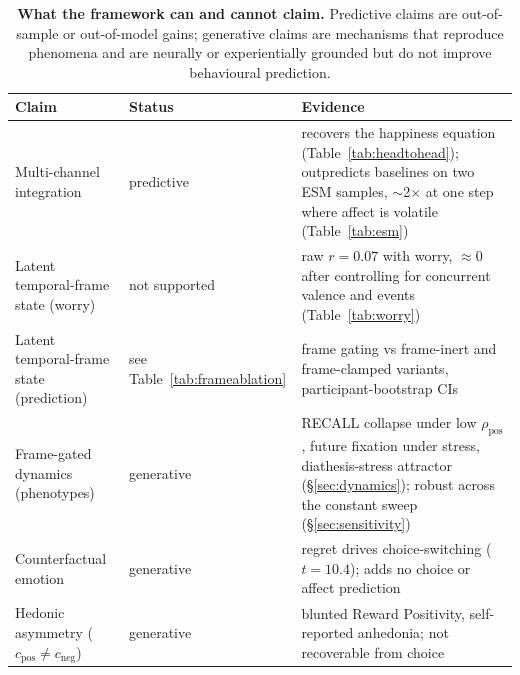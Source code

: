 \documentclass[11pt,a4paper]{article}
\begin{document}
\begin{table}[htbp]
\centering\small
\caption{\textbf{What the framework can and cannot claim.} Predictive claims are
out-of-sample or out-of-model gains; generative claims are mechanisms that reproduce
phenomena and are neurally or experientially grounded but do not improve behavioural
prediction.}
\label{tab:claims}
\begin{tabular}{p{3.9cm}p{1.9cm}p{6.4cm}}
\toprule
Claim & Status & Evidence \\
\midrule
Multi-channel integration & predictive & recovers the happiness equation (Table~\ref{tab:headtohead}); outpredicts baselines on two ESM samples, $\sim$2$\times$ at one step where affect is volatile (Table~\ref{tab:esm}) \\
Latent temporal-frame state (worry) & not supported & raw $r=0.07$ with worry, $\approx0$ after controlling for concurrent valence and events (Table~\ref{tab:worry}) \\
Latent temporal-frame state (prediction) & see Table~\ref{tab:frameablation} & frame gating vs frame-inert and frame-clamped variants, participant-bootstrap CIs \\
Frame-gated dynamics (phenotypes) & generative & RECALL collapse under low $\rho_{\text{pos}}$, future fixation under stress, diathesis-stress attractor (\S\ref{sec:dynamics}); robust across the constant sweep (\S\ref{sec:sensitivity}) \\
Counterfactual emotion & generative & regret drives choice-switching ($t=10.4$); adds no choice or affect prediction \\
Hedonic asymmetry ($c_{\text{pos}}\!\neq\!c_{\text{neg}}$) & generative & blunted Reward Positivity, self-reported anhedonia; not recoverable from choice \\
\bottomrule
\end{tabular}
\end{table}
\end{document}
